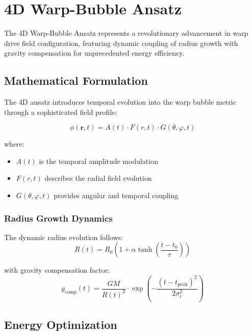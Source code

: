 \section{4D Warp-Bubble Ansatz}
\label{sec:4d_warp_ansatz}

The 4D Warp-Bubble Ansatz represents a revolutionary advancement in warp drive field configuration, featuring dynamic coupling of radius growth with gravity compensation for unprecedented energy efficiency.

\subsection{Mathematical Formulation}

The 4D ansatz introduces temporal evolution into the warp bubble metric through a sophisticated field profile:

\begin{equation}
\phi(\mathbf{r}, t) = A(t) \cdot F(r, t) \cdot G(\theta, \varphi, t)
\end{equation}

where:
\begin{itemize}
\item $A(t)$ is the temporal amplitude modulation
\item $F(r, t)$ describes the radial field evolution  
\item $G(\theta, \varphi, t)$ provides angular and temporal coupling
\end{itemize}

\subsubsection{Radius Growth Dynamics}

The dynamic radius evolution follows:
\begin{equation}
R(t) = R_0 \left(1 + \alpha \tanh\left(\frac{t - t_0}{\tau}\right)\right)
\end{equation}

with gravity compensation factor:
\begin{equation}
g_{\text{comp}}(t) = \frac{GM}{R(t)^2} \cdot \exp\left(-\frac{(t-t_{\text{peak}})^2}{2\sigma_t^2}\right)
\end{equation}

\subsection{Energy Optimization}

